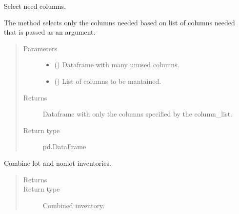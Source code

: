 \documentclass[letterpaper,10pt,english]{sphinxmanual}
\begin{document}
\begin{fulllineitems}
\label{\detokenize{source/optimization.datatools:optimization.datatools.dataprep.columns_needed}}
Select need columns.

The method selects only the columns needed based on list of columns needed
that is passed as an argument.
\begin{quote}\begin{description}
\item[{Parameters}] \leavevmode\begin{itemize}
\item {} 
 () \textendash{} Dataframe with many unused columns.

\item {} 
 () \textendash{} List of columns to be mantained.

\end{itemize}

\item[{Returns}] \leavevmode
{} \textendash{} Dataframe with only the columns specified by the column\_list.

\item[{Return type}] \leavevmode
pd.DataFrame

\end{description}\end{quote}

\end{fulllineitems}


\begin{fulllineitems}
\label{\detokenize{source/optimization.datatools:optimization.datatools.dataprep.combine_lot_non_lot}}
Combine lot and non\sphinxhyphen{}lot inventories.
\begin{quote}\begin{description}
\item[{Returns}] \leavevmode
{}

\item[{Return type}] \leavevmode
Combined inventory.

\end{description}\end{quote}

\end{fulllineitems}
\end{document}
